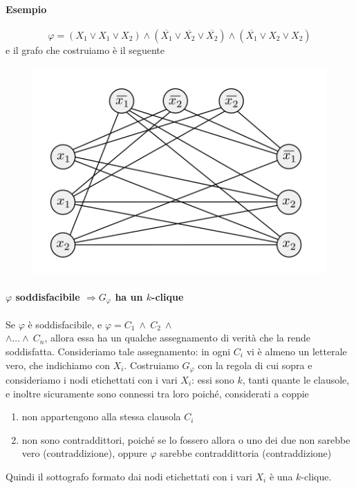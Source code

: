 \paragraph{Esempio}

\[
    \varphi = (X_1 \lor X_1 \lor X_2) \land (\overline{X_1} \lor \overline{X_2} \lor \overline{X_2}) \land (\overline{X_1} \lor X_2 \lor X_2)
\]
e il grafo che costruiamo è il seguente
\begin{figure}[H]
  \centering
  \includegraphics[scale=0.35]{GrafoClique}
\end{figure}

\paragraph{$\varphi$ soddisfacibile $\Rightarrow G_{\varphi}$ ha un $k$-clique}

Se $\varphi$ è soddisfacibile, e  $\varphi = C_1 \ \land \ C_2 \ \land$ \\
$\land \dots \land \ C_n$, allora essa ha un qualche assegnamento di verità che la rende soddisfatta. Consideriamo tale assegnamento: in ogni $C_i$ vi è almeno un letterale vero, che indichiamo con $X_i$. Costruiamo $G_{\varphi}$ con la regola di cui sopra e consideriamo i nodi etichettati con i vari $X_i$: essi sono $k$, tanti quante le clausole, e inoltre sicuramente sono connessi tra loro poiché, considerati a coppie
\begin{enumerate}
	\item non appartengono alla stessa clausola $C_i$

	\item non sono contraddittori, poiché se lo fossero allora o uno dei due non sarebbe vero (contraddizione), oppure $\varphi$ sarebbe contraddittoria (contraddizione)
\end{enumerate}
Quindi il sottografo formato dai nodi etichettati con i vari $X_i$ è una $k$-clique.

